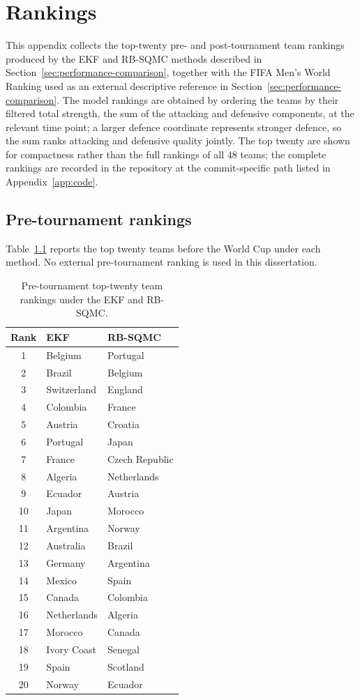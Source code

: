 \chapter{Rankings}
\label{app:rankings}

This appendix collects the top-twenty pre- and post-tournament team rankings produced by the EKF and RB-SQMC methods described in Section~\ref{sec:performance-comparison}, together with the FIFA Men's World Ranking \citep{fifaworldranking2026} used as an external descriptive reference in Section~\ref{sec:performance-comparison}. The model rankings are obtained by ordering the teams by their filtered total strength, the sum of the attacking and defensive components, at the relevant time point; a larger defence coordinate represents stronger defence, so the sum ranks attacking and defensive quality jointly. The top twenty are shown for compactness rather than the full rankings of all 48 teams; the complete rankings are recorded in the repository at the commit-specific path listed in Appendix~\ref{app:code}.

\section{Pre-tournament rankings}

Table~\ref{tab:rankings-pre} reports the top twenty teams before the World Cup under each method. No external pre-tournament ranking is used in this dissertation.

\begin{table}[H]
\centering
\begin{tabular}{cll}
\toprule
Rank & EKF & RB-SQMC \\
\midrule
1 & Belgium & Portugal \\
2 & Brazil & Belgium \\
3 & Switzerland & England \\
4 & Colombia & France \\
5 & Austria & Croatia \\
6 & Portugal & Japan \\
7 & France & Czech Republic \\
8 & Algeria & Netherlands \\
9 & Ecuador & Austria \\
10 & Japan & Morocco \\
11 & Argentina & Norway \\
12 & Australia & Brazil \\
13 & Germany & Argentina \\
14 & Mexico & Spain \\
15 & Canada & Colombia \\
16 & Netherlands & Algeria \\
17 & Morocco & Canada \\
18 & Ivory Coast & Senegal \\
19 & Spain & Scotland \\
20 & Norway & Ecuador \\
\bottomrule
\end{tabular}
\caption{Pre-tournament top-twenty team rankings under the EKF and RB-SQMC.}
\label{tab:rankings-pre}
\end{table}

